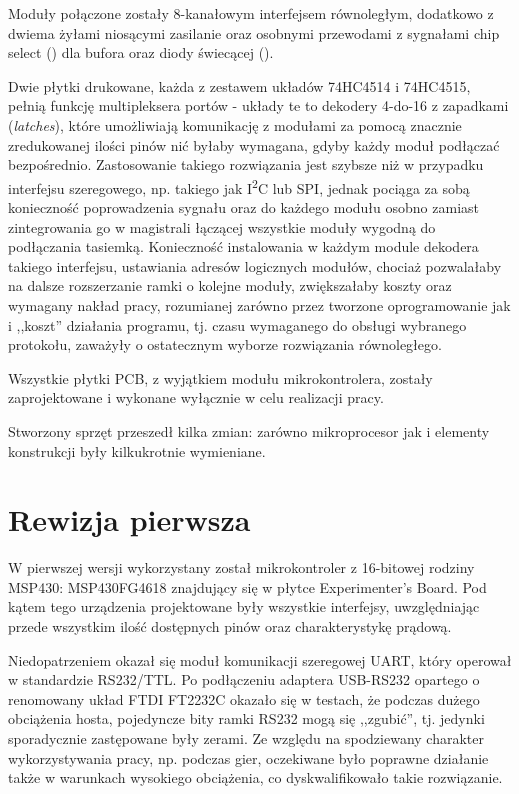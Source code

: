 Moduły połączone zostały 8-kanałowym interfejsem równoległym, dodatkowo z dwiema żyłami niosącymi zasilanie oraz osobnymi przewodami z sygnałami chip select () dla bufora oraz diody świecącej ().

Dwie płytki drukowane, każda z zestawem układów 74HC4514 i 74HC4515, pełnią funkcję multipleksera portów - układy te to dekodery 4-do-16 z zapadkami (\textsl{latches}), które umożliwiają komunikację z modułami za pomocą znacznie zredukowanej ilości pinów nić byłaby wymagana, gdyby każdy moduł podłączać bezpośrednio. Zastosowanie takiego rozwiązania jest szybsze niż w przypadku interfejsu szeregowego, np. takiego jak I\textsuperscript{2}C lub SPI, jednak pociąga za sobą konieczność poprowadzenia sygnału  oraz  do każdego modułu osobno zamiast zintegrowania go w magistrali łączącej wszystkie moduły wygodną do podłączania tasiemką. Konieczność instalowania w każdym module dekodera takiego interfejsu, ustawiania adresów logicznych modułów, chociaż pozwalałaby na dalsze rozszerzanie ramki o kolejne moduły, zwiększałaby koszty oraz wymagany nakład pracy, rozumianej zarówno przez tworzone oprogramowanie jak i ,,koszt'' działania programu, tj. czasu wymaganego do
obsługi wybranego protokołu, zaważyły o ostatecznym wyborze rozwiązania równoległego.

Wszystkie płytki PCB, z wyjątkiem modułu mikrokontrolera, zostały zaprojektowane i wykonane wyłącznie w celu realizacji pracy.

Stworzony sprzęt przeszedł kilka zmian: zarówno mikroprocesor jak i elementy konstrukcji były kilkukrotnie wymieniane.\\

\section{Rewizja pierwsza}

W pierwszej wersji wykorzystany został mikrokontroler z 16-bitowej rodziny MSP430: MSP430FG4618 znajdujący się w płytce Experimenter's Board. Pod kątem tego urządzenia projektowane były wszystkie interfejsy, uwzględniając przede wszystkim ilość dostępnych pinów oraz charakterystykę prądową.

Niedopatrzeniem okazał się moduł komunikacji szeregowej UART, który operował w standardzie RS232/TTL. Po podłączeniu adaptera USB-RS232 opartego o renomowany układ FTDI FT2232C okazało się w testach, że podczas dużego obciążenia hosta, pojedyncze bity ramki RS232 mogą się ,,zgubić'', tj.
jedynki sporadycznie zastępowane były zerami. Ze względu na spodziewany charakter wykorzystywania pracy, np. podczas gier, oczekiwane było poprawne działanie także w warunkach wysokiego obciążenia, co dyskwalifikowało takie rozwiązanie.\\

